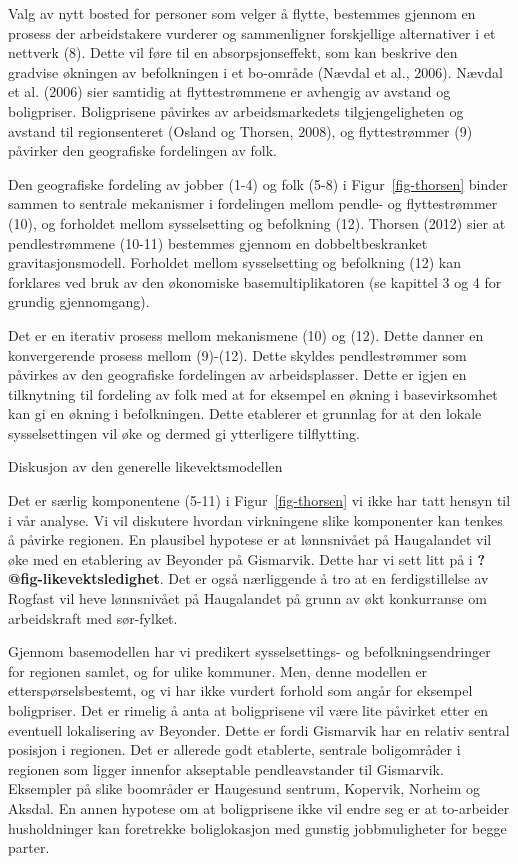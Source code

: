 \documentclass[
]{article}
\begin{document}
Valg av nytt bosted for personer som velger å flytte, bestemmes gjennom
en prosess der arbeidstakere vurderer og sammenligner forskjellige
alternativer i et nettverk (8). Dette vil føre til en absorpsjonseffekt,
som kan beskrive den gradvise økningen av befolkningen i et bo-område
(Nævdal et al., 2006). Nævdal et al. (2006) sier samtidig at
flyttestrømmene er avhengig av avstand og boligpriser. Boligprisene
påvirkes av arbeidsmarkedets tilgjengeligheten og avstand til
regionsenteret (Osland og Thorsen, 2008), og flyttestrømmer (9) påvirker
den geografiske fordelingen av folk.

Den geografiske fordeling av jobber (1-4) og folk (5-8) i
Figur~\ref{fig-thorsen} binder sammen to sentrale mekanismer i
fordelingen mellom pendle- og flyttestrømmer (10), og forholdet mellom
sysselsetting og befolkning (12). Thorsen (2012) sier at pendlestrømmene
(10-11) bestemmes gjennom en dobbeltbeskranket gravitasjonsmodell.
Forholdet mellom sysselsetting og befolkning (12) kan forklares ved bruk
av den økonomiske basemultiplikatoren (se kapittel 3 og 4 for grundig
gjennomgang).

Det er en iterativ prosess mellom mekanismene (10) og (12). Dette danner
en konvergerende prosess mellom (9)-(12). Dette skyldes pendlestrømmer
som påvirkes av den geografiske fordelingen av arbeidsplasser. Dette er
igjen en tilknytning til fordeling av folk med at for eksempel en økning
i basevirksomhet kan gi en økning i befolkningen. Dette etablerer et
grunnlag for at den lokale sysselsettingen vil øke og dermed gi
ytterligere tilflytting.

Diskusjon av den generelle likevektsmodellen

Det er særlig komponentene (5-11) i Figur~\ref{fig-thorsen} vi ikke har
tatt hensyn til i vår analyse. Vi vil diskutere hvordan virkningene
slike komponenter kan tenkes å påvirke regionen. En plausibel hypotese
er at lønnsnivået på Haugalandet vil øke med en etablering av Beyonder
på Gismarvik. Dette har vi sett litt på i
\textbf{?@fig-likevektsledighet}. Det er også nærliggende å tro at en
ferdigstillelse av Rogfast vil heve lønnsnivået på Haugalandet på grunn
av økt konkurranse om arbeidskraft med sør-fylket.

Gjennom basemodellen har vi predikert sysselsettings- og
befolkningsendringer for regionen samlet, og for ulike kommuner. Men,
denne modellen er etterspørselsbestemt, og vi har ikke vurdert forhold
som angår for eksempel boligpriser. Det er rimelig å anta at
boligprisene vil være lite påvirket etter en eventuell lokalisering av
Beyonder. Dette er fordi Gismarvik har en relativ sentral posisjon i
regionen. Det er allerede godt etablerte, sentrale boligområder i
regionen som ligger innenfor akseptable pendleavstander til Gismarvik.
Eksempler på slike boområder er Haugesund sentrum, Kopervik, Norheim og
Aksdal. En annen hypotese om at boligprisene ikke vil endre seg er at
to-arbeider husholdninger kan foretrekke boliglokasjon med gunstig
jobbmuligheter for begge parter.
\end{document}
